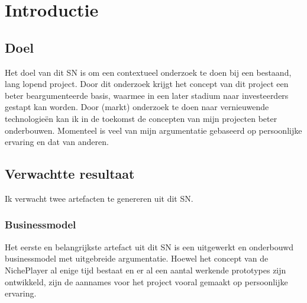 \section{Introductie}

\subsection{Doel}
Het doel van dit SN is om een contextueel onderzoek te doen bij een bestaand, lang lopend project. Door dit onderzoek krijgt het concept van dit project een beter beargumenteerde basis, waarmee in een later stadium naar investeerders gestapt kan worden. Door (markt) onderzoek te doen naar vernieuwende technologieën kan ik in de toekomst de concepten van mijn projecten beter onderbouwen. Momenteel is veel van mijn argumentatie gebaseerd op persoonlijke ervaring en dat van anderen.

\subsection{Verwachtte resultaat}
Ik verwacht twee artefacten te genereren uit dit SN.

\subsubsection*{Businessmodel}
Het eerste en belangrijkste artefact uit dit SN is een uitgewerkt en onderbouwd businessmodel met uitgebreide argumentatie. Hoewel het concept van de NichePlayer al enige tijd bestaat en er al een aantal werkende prototypes zijn ontwikkeld, zijn de aannames voor het project vooral gemaakt op persoonlijke ervaring. 

